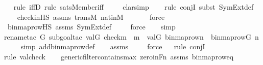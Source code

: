 \begin{isabellebody}
\ \ \isamarkupfalse%
{\isacharparenleft}{\kern0pt}rule\ iffD{}{\isacharcomma}{\kern0pt}\ rule\ sats{\isacharunderscore}{\kern0pt}Member{\isacharunderscore}{\kern0pt}iff{\isacharparenright}{\kern0pt}\isanewline
\ \ \ \isamarkupfalse%
\ clarsimp\isanewline
\ \ \ \isamarkupfalse%
{\isacharparenleft}{\kern0pt}rule\ conjI{\isacharcomma}{\kern0pt}\ subst\ SymExt{\isacharunderscore}{\kern0pt}def{\isacharparenright}{\kern0pt}\isanewline
\ \ \isamarkupfalse%
\ check{\isacharunderscore}{\kern0pt}in{\isacharunderscore}{\kern0pt}HS\ assms\ transM\ nat{\isacharunderscore}{\kern0pt}in{\isacharunderscore}{\kern0pt}M\ \isanewline
\ \ \ \ \isamarkupfalse%
\ force\isanewline
\ \ \isamarkupfalse%
\ binmap{\isacharunderscore}{\kern0pt}row{\isacharprime}{\kern0pt}{\isacharunderscore}{\kern0pt}HS\ assms\ SymExt{\isacharunderscore}{\kern0pt}def\isanewline
\ \ \ \isamarkupfalse%
\ force\isanewline
\ \ \isamarkupfalse%
\ simp\isanewline
\ \ \isamarkupfalse%
{\isacharparenleft}{\kern0pt}rename{\isacharunderscore}{\kern0pt}tac\ G{\isacharcomma}{\kern0pt}\ subgoal{\isacharunderscore}{\kern0pt}tac\ {\isachardoublequoteopen}val{\isacharparenleft}{\kern0pt}G{\isacharcomma}{\kern0pt}\ check{\isacharparenleft}{\kern0pt}m{\isacharparenright}{\kern0pt}{\isacharparenright}{\kern0pt}\ {\isacharequal}{\kern0pt}\ m\ {\isasymand}\ val{\isacharparenleft}{\kern0pt}G{\isacharcomma}{\kern0pt}\ binmap{\isacharunderscore}{\kern0pt}row{\isacharprime}{\kern0pt}{\isacharparenleft}{\kern0pt}n{\isacharparenright}{\kern0pt}{\isacharparenright}{\kern0pt}\ {\isacharequal}{\kern0pt}\ binmap{\isacharunderscore}{\kern0pt}row{\isacharparenleft}{\kern0pt}G{\isacharcomma}{\kern0pt}\ n{\isacharparenright}{\kern0pt}{\isachardoublequoteclose}{\isacharparenright}{\kern0pt}\isanewline
\ \ \ \isamarkupfalse%
\ {\isacharparenleft}{\kern0pt}simp\ add{\isacharcolon}{\kern0pt}binmap{\isacharunderscore}{\kern0pt}row{\isacharunderscore}{\kern0pt}def{\isacharparenright}{\kern0pt}\isanewline
\ \ \isamarkupfalse%
\ assms\isanewline
\ \ \ \isamarkupfalse%
\ force\isanewline
\ \ \isamarkupfalse%
{\isacharparenleft}{\kern0pt}rule\ conjI{\isacharparenright}{\kern0pt}\isanewline
\ \ \ \isamarkupfalse%
{\isacharparenleft}{\kern0pt}rule\ valcheck{\isacharparenright}{\kern0pt}\isanewline
\ \ \isamarkupfalse%
\ generic{\isacharunderscore}{\kern0pt}filter{\isacharunderscore}{\kern0pt}contains{\isacharunderscore}{\kern0pt}max\ zero{\isacharunderscore}{\kern0pt}in{\isacharunderscore}{\kern0pt}Fn\ assms\ binmap{\isacharunderscore}{\kern0pt}row{\isacharunderscore}{\kern0pt}eq\isanewline

\end{isabellebody}

